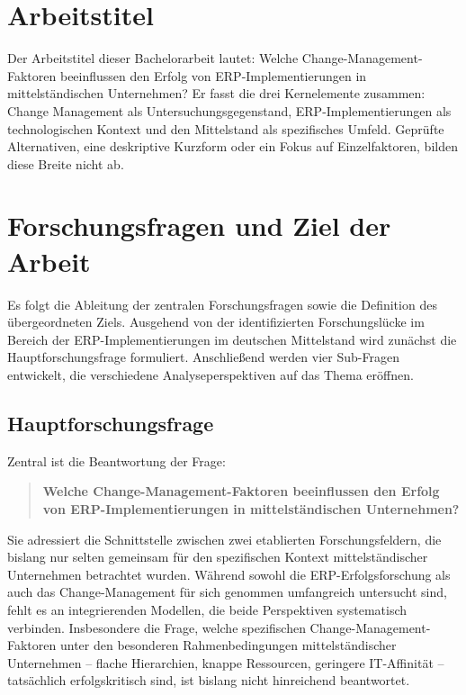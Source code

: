 \section{Arbeitstitel}

Der Arbeitstitel dieser Bachelorarbeit lautet: \glqq Welche Change-Management-Faktoren beeinflussen den Erfolg von ERP-Implementierungen in mittelständischen Unternehmen?\grqq{} Er fasst die drei Kernelemente zusammen: Change Management als Untersuchungsgegenstand, ERP-Implementierungen als technologischen Kontext und den Mittelstand als spezifisches Umfeld. Geprüfte Alternativen, eine deskriptive Kurzform oder ein Fokus auf Einzelfaktoren, bilden diese Breite nicht ab.

\section{Forschungsfragen und Ziel der Arbeit}

Es folgt die Ableitung der zentralen Forschungsfragen sowie die Definition des übergeordneten Ziels. Ausgehend von der identifizierten Forschungslücke im Bereich der ERP-Implementierungen im deutschen Mittelstand wird zunächst die Hauptforschungsfrage formuliert. Anschlie\ss{}end werden vier Sub-Fragen entwickelt, die verschiedene Analyseperspektiven auf das Thema eröffnen.

\subsection{Hauptforschungsfrage}

Zentral ist die Beantwortung der Frage:

\begin{quote}
\textbf{Welche Change-Management-Faktoren beeinflussen den Erfolg von ERP-Implementierungen in mittelständischen Unternehmen?}
\end{quote}

Sie adressiert die Schnittstelle zwischen zwei etablierten Forschungsfeldern, die bislang nur selten gemeinsam für den spezifischen Kontext mittelständischer Unternehmen betrachtet wurden. Während sowohl die ERP-Erfolgsforschung als auch das Change-Management für sich genommen umfangreich untersucht sind, fehlt es an integrierenden Modellen, die beide Perspektiven systematisch verbinden. Insbesondere die Frage, welche spezifischen Change-Management-Faktoren unter den besonderen Rahmenbedingungen mittelständischer Unternehmen -- flache Hierarchien, knappe Ressourcen, geringere IT-Affinität -- tatsächlich erfolgskritisch sind, ist bislang nicht hinreichend beantwortet.

